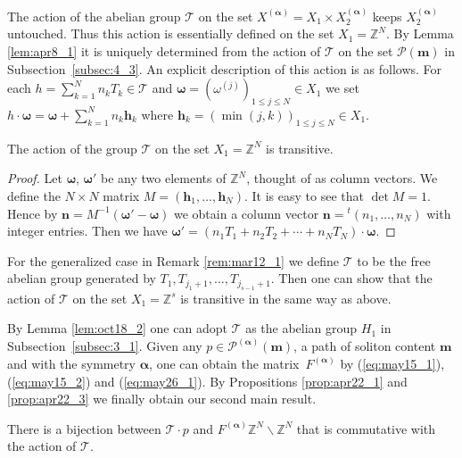 \documentclass[pdftex]{sigma}
\newcommand{\Z}{{\mathbb Z}}
\newcommand\bom{\boldsymbol{\omega}}
\newcommand\boa{\boldsymbol{\alpha}}
\newcommand{\m}{{\boldsymbol m}}
\begin{document}
The action of the abelian group ${\mathcal T}$ on the set $X^{(\boa)} = X_1 \times X_2^{(\boa)}$
keeps $X_2^{(\boa)}$ untouched.
Thus this action is essentially def\/ined on the set $X_1 = \Z^N$.
%
By Lemma \ref{lem:apr8_1} it is uniquely determined from the action of ${\mathcal T}$ on the set ${\mathcal P}(\m)$
in Subsection~\ref{subsec:4_3}.
%
An explicit description of this action is as follows.
For each $h = \sum_{k=1}^N n_k T_k \in {\mathcal T}$ and $\bom = (\omega^{(j)})_{1 \leq j \leq N} \in X_1$
we set $h \cdot \bom = \bom + \sum_{k=1}^N n_k \boldsymbol{h}_k$ where
$\boldsymbol{h}_k = (\min(j,k))_{1 \leq j \leq N} \in X_1$.


\begin{lemma}\label{lem:oct18_2}
The action of the group ${\mathcal T}$ on the set $X_1 = \Z^N$ is transitive.
\end{lemma}
\begin{proof}
Let $\boldsymbol{\omega}$, $\boldsymbol{\omega'}$ be any two elements of $\Z^N$,
thought of as column vectors.
We def\/ine the $N \times N$ matrix $M = (\boldsymbol{h}_1,\ldots,\boldsymbol{h}_N)$.
It is easy to see that $\det M = 1$.
Hence by $\boldsymbol{n} =M^{-1} (\boldsymbol{\omega'} - \boldsymbol{\omega})$
we obtain a column vector $\boldsymbol{n} = {}^t (n_1,\ldots,n_N)$ with integer entries.
Then we have $\boldsymbol{\omega'} =(n_1 T_1 + n_2 T_2 + \cdots + n_N T_N) \cdot \boldsymbol{\omega}$.
\end{proof}
%
\begin{remark}\label{rem:may8_1}
For the generalized case in Remark \ref{rem:mar12_1}
we def\/ine ${\mathcal T}$ to be the free abelian group
generated by $T_1, T_{j_1+1},\ldots, T_{j_{s-1}+1}$.
Then one can show that the action of ${\mathcal T}$ on the set $X_1=\Z^s$ is transitive
in the same way as above.
\end{remark}


By Lemma \ref{lem:oct18_2} one can adopt ${\mathcal T}$ as the abelian group $H_1$ in Subsection~\ref{subsec:3_1}.
Given any $p \in {\mathcal P}^{(\boa)}(\m)$, a path of soliton content $\m$ and with the symmetry $\boa$,
one can obtain the matrix~$F^{(\boa)}$ by (\ref{eq:may15_1}),
(\ref{eq:may15_2}) and (\ref{eq:may26_1}).
By Propositions \ref{prop:apr22_1} and \ref{prop:apr22_3} we f\/inally obtain our second main result.
\begin{theorem}\label{th:main}
There is a bijection between ${\mathcal T} \cdot p$ and $F^{(\boa)} \Z^N \backslash \Z^N$
that is commutative with the action of ${\mathcal T}$.
\end{theorem}
\end{document}
